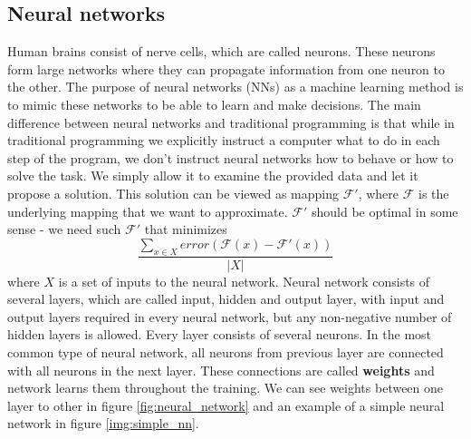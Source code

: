     \subsection{Neural networks}
    Human brains consist of nerve cells, which are called neurons. These neurons form large networks where they can propagate information from one neuron to the other. The purpose of neural networks (NNs) as a machine learning method is to mimic these networks to be able to learn and make decisions. The main difference between neural networks and traditional programming is that while in traditional programming we explicitly instruct a computer what to do in each step of the program, we don't instruct neural networks how to behave or how to solve the task. We simply allow it to examine the provided data and let it propose a solution. This solution can be viewed as mapping $\mathcal{F'}$, where $\mathcal{F}$ is the underlying mapping that we want to approximate. $\mathcal{F'}$ should be optimal in some sense - we need such $\mathcal{F'}$ that minimizes $$\frac{\sum_{x \in X} error(\mathcal{F}(x) - \mathcal{F'}(x))}{|X|}$$ where $X$ is a set of inputs to the neural network.
    \newline
    Neural network consists of several layers, which are called input, hidden and output layer, with input and output layers required in every neural network, but any non-negative number of hidden layers is allowed. Every layer consists of several neurons. In the most common type of neural network, all neurons from previous layer are connected with all neurons in the next layer. These connections are called \textbf{weights} and network learns them throughout the training. We can see weights between one layer to other in figure \ref{fig:neural_network} and an example of a simple neural network in figure \ref{img:simple_nn}.
